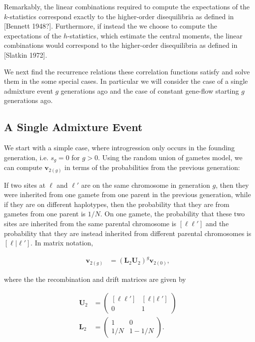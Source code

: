\documentclass[11pt]{amsart}
\begin{document}
Remarkably, the linear combinations required to compute the expectations of the $k$-statistics correspond exactly to the higher-order disequilibria as defined in [Bennett 1948?].
Furthermore, if instead the we choose to compute the expectations of the $h$-statistics, which estimate the central moments, the linear combinations would correspond to the higher-order disequilibria as defined in [Slatkin 1972].

We next find the recurrence relations these correlation functions satisfy and solve them in the some special cases. In particular we will consider the case of a single admixture event $g$ generations ago and the case of constant gene-flow starting $g$ generations ago.

\subsection*{A Single Admixture Event}
We start with a simple case, where introgression only occurs in the founding generation, i.e. $s_g=0$ for $g>0$. Using the random union of gametes model, we can compute $\mathbf{v}_{2(g)}$ in terms of the probabilities from the previous generation:

If two sites at $\ell$ and $\ell'$ are on the same chromosome in generation $g$, then they were inherited from one gamete from one parent in the previous generation, while if they 	are on different haplotypes, then the probability that they are from gametes from one parent is $1/N$.
On one gamete, the probability that these two sites are inherited from the same parental chromosome is $[\ell \ell']$ and the probability that they are instead inherited from different parental chromosomes is $[\ell|\ell']$.
In matrix notation, 

\begin{align*}
\mathbf{v}_{2(g)}&=
		\left(\mathbf{L}_2\mathbf{U}_2\right)^g
		\mathbf{v}_{2(0)},
\end{align*}

where the the recombination and drift matrices are given by

\begin{align*}
	\mathbf{U}_2&=\left( \begin{array}{cc}
					 {[\ell \ell']} & [\ell|\ell']\\
					 0 & 1
				\end{array} \right)\\
	\mathbf{L}_2&=\left( \begin{array}{cc}
					 1 & 0\\
					 1/N & 1-1/N
				\end{array} \right).
\end{align*}
\end{document}
